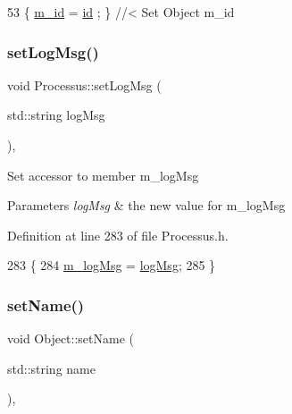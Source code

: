 \begin{DoxyCode}
53 \{ \hyperlink{classObject_aca74b9dbfed7b5556ea2d56c65b6b6b0}{m\_id}    = \hyperlink{classObject_af99145335cc61ff6e2798ea17db009d2}{id}    ; \} \textcolor{comment}{//< Set Object m\_id}
\end{DoxyCode}
\mbox{\label{classProcessus_a471833f89047aa9a7ff6200a31c17a1d}} 
\subsubsection{\texorpdfstring{set\+Log\+Msg()}{setLogMsg()}}
{\footnotesize\ttfamily void Processus\+::set\+Log\+Msg (\begin{DoxyParamCaption}\item[{std\+::string}]{log\+Msg }\end{DoxyParamCaption})\hspace{0.3cm}{\ttfamily [inline]}, {\ttfamily [inherited]}}

Set accessor to member m\+\_\+log\+Msg 
\begin{DoxyParams}{Parameters}
{\em log\+Msg} & the new value for m\+\_\+log\+Msg \\
\hline
\end{DoxyParams}


Definition at line 283 of file Processus.\+h.


\begin{DoxyCode}
283                                     \{
284     \hyperlink{classProcessus_a3bc0140a3a69a83951ab7f9986bd2c84}{m\_logMsg} = \hyperlink{classProcessus_a42fdeb17dc13ba854222666b6aa29b61}{logMsg};
285   \}
\end{DoxyCode}
\mbox{\label{classObject_ae30fea75683c2d149b6b6d17c09ecd0c}} 
\subsubsection{\texorpdfstring{set\+Name()}{setName()}}
{\footnotesize\ttfamily void Object\+::set\+Name (\begin{DoxyParamCaption}\item[{std\+::string}]{name }\end{DoxyParamCaption})\hspace{0.3cm}{\ttfamily [inline]}, {\ttfamily [inherited]}}



